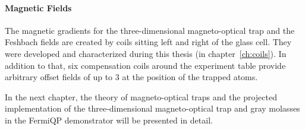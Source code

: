 \paragraph{Magnetic Fields}
The magnetic gradients for the three-dimensional magneto-optical trap and the Fesh\-bach fields are created by coils sitting left and right of the glass cell. They were developed and characterized during this thesis (in chapter~\ref{ch:coils}). In addition to that, six compensation coils around the experiment table provide arbitrary offset fields of up to \SI[]{3}{\gauss} at the position of the trapped atoms.

\null

In the next chapter, the theory of magneto-optical traps and the projected implementation of the three-dimensional magneto-optical trap and gray molasses in the FermiQP demonstrator will be presented in detail.